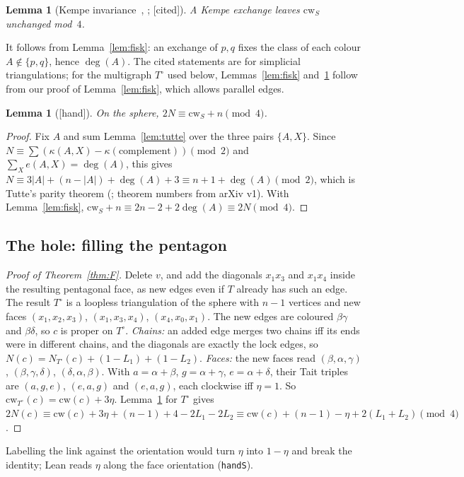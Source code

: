 \documentclass[11pt]{article}
\newtheorem{lemma}[theorem]{Lemma}
\theoremstyle{definition}
\newcommand{\lab}[1]{\textsf{[#1]}}
\newcommand{\lean}[1]{\texttt{#1}}
\newcommand{\cw}{\mathrm{cw}}
\begin{document}
\begin{lemma}[Kempe invariance~{\cite[Sec.~5]{mohar2006}}, {\cite[Cor.~3.3]{moharsalas2009}}; \lab{cited}]\label{lem:KI}
A Kempe exchange leaves $\cw_S$ unchanged mod~$4$.
\end{lemma}
It follows from Lemma~\ref{lem:fisk}: an exchange of $p,q$ fixes the class of each colour $A\notin\{p,q\}$, hence $\deg(A)$. The cited statements are for simplicial triangulations; for the multigraph $T^\circ$ used below, Lemmas~\ref{lem:fisk} and~\ref{lem:KI} follow from our proof of Lemma~\ref{lem:fisk}, which allows parallel edges.

\begin{lemma}[\lab{hand}]\label{lem:F0}
On the sphere, $2N\equiv \cw_S+n\pmod 4$.
\end{lemma}
\begin{proof}
Fix $A$ and sum Lemma~\ref{lem:tutte} over the three pairs $\{A,X\}$. Since $N\equiv\sum(\kappa(A,X)-\kappa(\text{complement}))\pmod 2$ and $\sum_X e(A,X)=\deg(A)$, this gives $N\equiv 3|A|+(n-|A|)+\deg(A)+3\equiv n+1+\deg(A)\pmod 2$, which is Tutte's parity theorem (\cite[Thm.~1]{mohar2021}; theorem numbers from arXiv v1). With Lemma~\ref{lem:fisk}, $\cw_S+n\equiv 2n-2+2\deg(A)\equiv 2N\pmod 4$.
\end{proof}

\subsection{The hole: filling the pentagon}
\begin{proof}[Proof of Theorem~\ref{thm:F}]
Delete $v$, and add the diagonals $x_1x_3$ and $x_1x_4$ inside the resulting pentagonal face, as new edges even if $T$ already has such an edge. The result $T^\circ$ is a loopless triangulation of the sphere with $n-1$ vertices and new faces $(x_1,x_2,x_3)$, $(x_1,x_3,x_4)$, $(x_4,x_0,x_1)$. The new edges are coloured $\beta\gamma$ and $\beta\delta$, so $c$ is proper on $T^\circ$.
\emph{Chains:} an added edge merges two chains iff its ends were in different chains, and the diagonals are exactly the lock edges, so $N(c)=N_{T^\circ}(c)+(1-L_1)+(1-L_2)$.
\emph{Faces:} the new faces read $(\beta,\alpha,\gamma)$, $(\beta,\gamma,\delta)$, $(\delta,\alpha,\beta)$. With $a=\alpha{+}\beta$, $g=\alpha{+}\gamma$, $e=\alpha{+}\delta$, their Tait triples are $(a,g,e)$, $(e,a,g)$ and $(e,a,g)$, each clockwise iff $\eta=1$. So $\cw_{T^\circ}(c)=\cw(c)+3\eta$.
Lemma~\ref{lem:F0} for $T^\circ$ gives $2N(c)\equiv\cw(c)+3\eta+(n-1)+4-2L_1-2L_2\equiv\cw(c)+(n-1)-\eta+2(L_1+L_2)\pmod 4$.
\end{proof}
Labelling the link against the orientation would turn $\eta$ into $1-\eta$ and break the identity; Lean reads $\eta$ along the face orientation (\lean{handS}).
\end{document}
